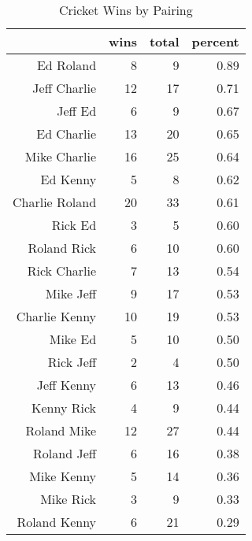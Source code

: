 \documentclass{article}\usepackage[]{graphicx}\usepackage[]{color}
\begin{document}
\begin{table}[ht]
\begin{center}
\caption{Cricket Wins by Pairing}
\begin{tabular}{rrrr}
  \hline
 & wins & total & percent \\ 
  \hline
Ed Roland &   8 &   9 & 0.89 \\ 
  Jeff Charlie &  12 &  17 & 0.71 \\ 
  Jeff Ed &   6 &   9 & 0.67 \\ 
  Ed Charlie &  13 &  20 & 0.65 \\ 
  Mike Charlie &  16 &  25 & 0.64 \\ 
  Ed Kenny &   5 &   8 & 0.62 \\ 
  Charlie Roland &  20 &  33 & 0.61 \\ 
  Rick Ed &   3 &   5 & 0.60 \\ 
  Roland Rick &   6 &  10 & 0.60 \\ 
  Rick Charlie &   7 &  13 & 0.54 \\ 
  Mike Jeff &   9 &  17 & 0.53 \\ 
  Charlie Kenny &  10 &  19 & 0.53 \\ 
  Mike Ed &   5 &  10 & 0.50 \\ 
  Rick Jeff &   2 &   4 & 0.50 \\ 
  Jeff Kenny &   6 &  13 & 0.46 \\ 
  Kenny Rick &   4 &   9 & 0.44 \\ 
  Roland Mike &  12 &  27 & 0.44 \\ 
  Roland Jeff &   6 &  16 & 0.38 \\ 
  Mike Kenny &   5 &  14 & 0.36 \\ 
  Mike Rick &   3 &   9 & 0.33 \\ 
  Roland Kenny &   6 &  21 & 0.29 \\ 
   \hline
\end{tabular}
\end{center}
\end{table}
\end{document}
